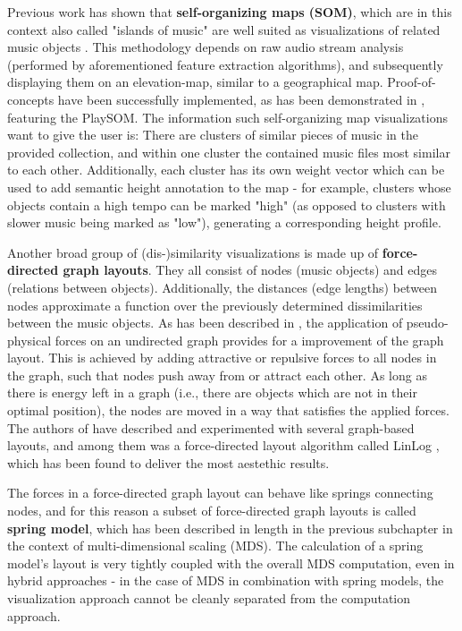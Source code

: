 Previous work has shown that \textbf{self-organizing maps (SOM)}, which are in this context also called "islands of music" are well suited as visualizations of related music objects \cite{Cooper:2006:VAM}. This methodology depends on raw audio stream analysis (performed by aforementioned feature extraction algorithms), and subsequently displaying them on an elevation-map, similar to a geographical map. Proof-of-concepts have been successfully implemented, as has been demonstrated in \cite{NeuDitRau_05ismir}, featuring the PlaySOM. The information such self-organizing map visualizations want to give the user is: There are clusters of similar pieces of music in the provided collection, and within one cluster the contained music files most similar to each other. Additionally, each cluster has its own weight vector which can be used to add semantic height annotation to the map - for example, clusters whose objects contain a high tempo can be marked "high" (as opposed to clusters with slower music being marked as "low"), generating a corresponding height profile.

Another broad group of (dis-)similarity visualizations is made up of \textbf{force-directed graph layouts}. They all consist of nodes (music objects) and edges (relations between objects). Additionally, the distances (edge lengths) between nodes approximate a function over the previously determined dissimilarities between the music objects.
As has been described in \cite{gansner:1998}, the application of pseudo-physical forces on an undirected graph provides for a improvement of the graph layout. This is achieved by adding attractive or repulsive forces to all nodes in the graph, such that nodes push away from or attract each other. As long as there is energy left in a graph (i.e., there are objects which are not in their optimal position), the nodes are moved in a way that satisfies the applied forces. The authors of \cite{Muelder:2010fk} have described and experimented with several graph-based layouts, and among them was a force-directed layout algorithm called LinLog \cite{noack:2003}, which has been found to deliver the most aestethic results.

The forces in a force-directed graph layout can behave like springs connecting nodes, and for this reason a subset of force-directed graph layouts is called \textbf{spring model}, which has been described in length in the previous subchapter in the context of multi-dimensional scaling (MDS). The calculation of a spring model's layout is very tightly coupled with the overall MDS computation, even in hybrid approaches \cite{Morrison:2003:FMS} - in the case of MDS in combination with spring models, the visualization approach cannot be cleanly separated from the computation approach.

